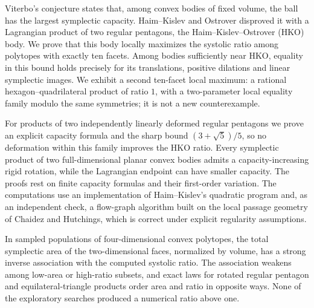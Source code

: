 Viterbo's conjecture states that, among convex bodies of fixed volume, the
ball has the largest symplectic capacity. Haim--Kislev and Ostrover
disproved it with a Lagrangian product of two regular pentagons, the
Haim--Kislev--Ostrover (HKO) body. We prove that this body locally maximizes
the systolic ratio among polytopes with exactly ten facets. Among bodies
sufficiently near HKO, equality in this bound holds precisely for its
translations, positive dilations and linear symplectic images. We exhibit a
second ten-facet local maximum: a rational hexagon--quadrilateral product of
ratio $1$, with a two-parameter local equality family modulo the same
symmetries; it is not a new counterexample.

For products of two independently linearly deformed regular pentagons we
prove an explicit capacity formula and the sharp bound $(3+\sqrt5)/5$, so no
deformation within this family improves the HKO ratio. Every symplectic
product of two full-dimensional planar convex bodies admits a
capacity-increasing rigid rotation, while the Lagrangian endpoint can have
smaller capacity. The proofs rest on finite capacity formulas and their
first-order variation. The computations use an implementation of
Haim--Kislev's quadratic program and, as an independent check, a flow-graph
algorithm built on the local passage geometry of Chaidez and Hutchings,
which is correct under explicit regularity assumptions.

In sampled populations of four-dimensional convex polytopes, the total
symplectic area of the two-dimensional faces, normalized by volume, has a
strong inverse association with the computed systolic ratio. The association
weakens among low-area or high-ratio subsets, and exact laws for rotated
regular pentagon and equilateral-triangle products order area and ratio in
opposite ways. None of the exploratory searches produced a numerical ratio
above one.
